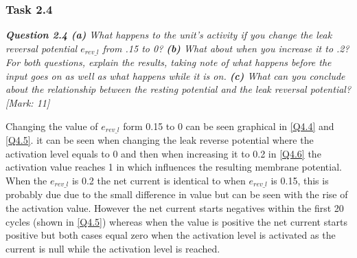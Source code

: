 \subsubsection{Task 2.4}
\label{Q1:Expl 2.6.1(2.4) SubSubSection}

\begin{tcolorbox}[colback=gray!20!white,colframe=gray!20!white]
  \emph{\textbf{Question 2.4 (a)} What happens to the unit’s activity if you change the leak reversal potential $e_{rev\_l}$ from .15 to 0? \textbf{(b)} What about when you increase it to .2? For both questions, explain the results, taking note of what happens before the input goes on as well as what happens while it is on. \textbf{(c)} What can you conclude about the relationship between the resting potential and the leak reversal potential? [Mark: 11]}
\end{tcolorbox} 
\vspace{0.5cm}

Changing the value of $e_{rev\_l}$ form 0.15 to 0 can be seen graphical in \cref{Q4.4} and \cref{Q4.5}. it can be seen when changing the leak reverse potential where the activation level equals to 0 and then when increasing it to 0.2 in \cref{Q4.6} the activation value reaches 1 in which influences the resulting membrane potential. When the $e_{rev\_l}$ is 0.2 the net current is identical to when $e_{rev\_l}$ is 0.15, this is probably due due to the small difference in value but can be seen with the rise of the activation value. However the net current starts negatives within the first 20 cycles (shown in \cref{Q4.5}) whereas when the value is positive the net current starts positive but both cases equal zero when the activation level is activated as the current is null while the activation level is reached. \\




